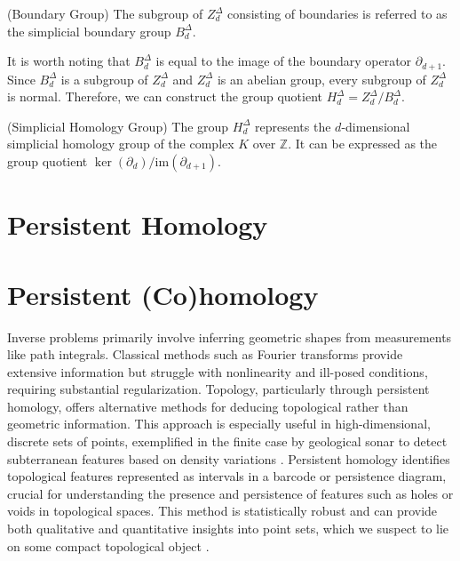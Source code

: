 \begin{definition}
	{(Boundary Group) \cite[§2.3]{zomorodian2004computing}} The subgroup of $Z^{\Delta}
	_{d}$ consisting of boundaries is referred to as the simplicial boundary group
	$B^{\Delta}_{d}$.
\end{definition}

It is worth noting that $B^{\Delta}_{d}$ is equal to the image of the boundary operator
$\partial_{d+1}$. Since $B^{\Delta}_{d}$ is a subgroup of $Z^{\Delta}_{d}$ and
$Z^{\Delta}_{d}$ is an abelian group, every subgroup of $Z^{\Delta}_{d}$ is normal.
Therefore, we can construct the group quotient $H^{\Delta}_{d} = Z^{\Delta}_{d} /
B^{\Delta}_{d}$.

\begin{definition}
	{(Simplicial Homology Group) \cite[§2.1]{hatcher2005algebraic}} The group $H^{\Delta}
	_{d}$ represents the $d$-dimensional simplicial homology group of the complex $K$
	over $\mathbb{Z}$. It can be expressed as the group quotient
	$\ker(\partial_{d}) / \text{im}(\partial_{d+1})$.
\end{definition}

\section{Persistent Homology}

\section{Persistent (Co)homology}
Inverse problems primarily involve inferring geometric shapes from measurements like
path integrals. Classical methods such as Fourier transforms provide extensive
information but struggle with nonlinearity and ill-posed conditions, requiring substantial
regularization. Topology, particularly through persistent homology, offers
alternative methods for deducing topological rather than geometric information. This
approach is especially useful in high-dimensional, discrete sets of points, exemplified
in the finite case by geological sonar to detect subterranean features based on density
variations \cite[§1]{de2011dualities}. Persistent homology identifies
topological features represented as intervals in a barcode or persistence
diagram, crucial for understanding the presence and persistence of features such
as holes or voids in topological spaces. This method is statistically robust and
can provide both qualitative and quantitative insights into point sets, which we
suspect to lie on some compact topological object \cite{chazal2014persistence,chazal2009proximity}.

